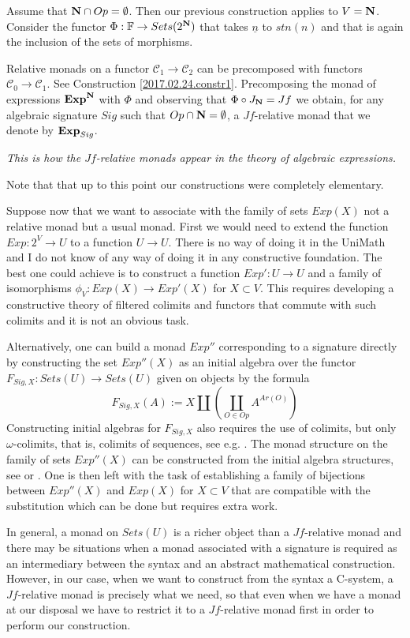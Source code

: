 \documentclass[12pt]{amsart}
\newcommand{\sr}{\rightarrow}
\newcommand{\nn}{{\bf N\rm}}
\newcommand{\nat}{\nn}
\newcommand{\uu}{\underline}
\newcommand{\C}{{\mathcal C}}
\newcommand{\FF}{{\mathbb F}}
\newcommand{\ff}[1]{\uu{#1}}
\begin{document}
Assume that $\nat\cap Op=\emptyset$. Then our previous construction applies to $V=\nat$. Consider the functor $\Phi:\FF\sr Sets(2^{\nat})$ that takes $\ff{n}$ to $stn(n)$ and that is again the inclusion of the sets of morphisms. 

Relative monads on a functor $\C_1\sr \C_2$ can be precomposed with functors $\C_0\sr\C_1$. See Construction \ref{2017.02.24.constr1}. Precomposing the monad of expressions ${\bf Exp}^{\nat}$ with $\Phi$ and observing that $\Phi\circ J_{\nat}=Jf$ we obtain, for any algebraic signature $Sig$ such that $Op\cap \nat=\emptyset$, a $Jf$-relative monad that we denote by ${\bf Exp}_{Sig}$. 

{\em This is how the $Jf$-relative monads appear in the theory of algebraic expressions.} 

Note that that up to this point our constructions were completely elementary. 

Suppose now that we want to associate with the family of sets $Exp(X)$ not a relative monad but a usual monad. First we would need to extend the function $Exp:2^V\sr U$ to a function $U\sr U$. There is no way of doing it in the UniMath and I do not know of any way of doing it in any constructive foundation. The best one could achieve is to construct a function $Exp':U\sr U$ and a family of isomorphisms $\phi_V:Exp(X)\sr Exp'(X)$ for $X\subset  V$. This requires developing a constructive theory of filtered colimits and functors that commute with such colimits and it is not an obvious task.  

Alternatively, one can build a monad $Exp''$ corresponding to a signature directly by constructing the set $Exp''(X)$ as an initial algebra over the functor $F_{Sig,X}:Sets(U)\sr Sets(U)$ given on objects by the formula
%
$$F_{Sig,X}(A):=X\coprod(\coprod_{O\in Op}A^{Ar(O)})$$
%
Constructing initial algebras for $F_{Sig,X}$ also requires the use of colimits, but only $\omega$-colimits, that is, colimits of sequences, see e.g. \cite{Adamek1974}. The monad structure on the family of sets $Exp''(X)$ can be constructed from the initial algebra structures, see \cite{Barr1970} or \cite[Th.3, p.161]{MatthesUustalu}. One is then left with the task of establishing a family of bijections between $Exp''(X)$ and $Exp(X)$ for $X\subset V$ that are compatible with the substitution which can be done but requires extra work. 

In general, a monad on $Sets(U)$ is a richer object than a $Jf$-relative monad and there may be situations when a monad associated with a signature is required as an intermediary between the syntax and an abstract mathematical construction. However, in our case, when we want to construct from the syntax a C-system,  a $Jf$-relative monad is precisely what we need, so that even when we have a monad at our disposal we have to restrict it to a $Jf$-relative monad first in order to perform our construction.   
\end{document}
